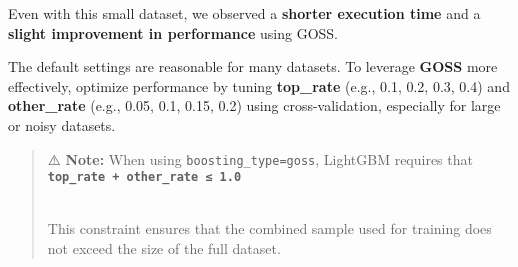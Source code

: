 \documentclass[
  letterpaper,
  DIV=11,
  numbers=noendperiod]{scrreprt}
\begin{document}
Even with this small dataset, we observed a \textbf{shorter execution
time} and a \textbf{slight improvement in performance} using GOSS.

The default settings are reasonable for many datasets. To leverage
\textbf{GOSS} more effectively, optimize performance by tuning
\textbf{top\_rate} (e.g., 0.1, 0.2, 0.3, 0.4) and \textbf{other\_rate}
(e.g., 0.05, 0.1, 0.15, 0.2) using cross-validation, especially for
large or noisy datasets.

\begin{quote}
⚠️ \textbf{Note:} When using
\texttt{boosting\_type=\textquotesingle{}goss\textquotesingle{}},
LightGBM requires that\\
\textbf{\texttt{top\_rate\ +\ other\_rate\ ≤\ 1.0}}\strut \\
This constraint ensures that the combined sample used for training does
not exceed the size of the full dataset.
\end{quote}
\end{document}
